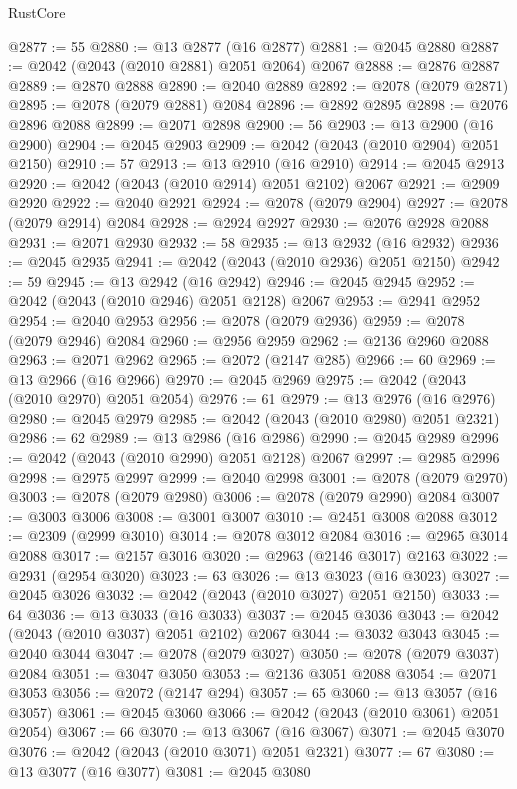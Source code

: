 \begin{lexlean}{RustCore}
\begin{coremodule}
@2877 := 55
@2880 := @13 @2877 (@16 @2877)
@2881 := @2045 @2880
@2887 := @2042 (@2043 (@2010 @2881) @2051 @2064) @2067
@2888 := @2876 @2887
@2889 := @2870 @2888
@2890 := @2040 @2889
@2892 := @2078 (@2079 @2871)
@2895 := @2078 (@2079 @2881) @2084
@2896 := @2892 @2895
@2898 := @2076 @2896 @2088
@2899 := @2071 @2898
@2900 := 56
@2903 := @13 @2900 (@16 @2900)
@2904 := @2045 @2903
@2909 := @2042 (@2043 (@2010 @2904) @2051 @2150)
@2910 := 57
@2913 := @13 @2910 (@16 @2910)
@2914 := @2045 @2913
@2920 := @2042 (@2043 (@2010 @2914) @2051 @2102) @2067
@2921 := @2909 @2920
@2922 := @2040 @2921
@2924 := @2078 (@2079 @2904)
@2927 := @2078 (@2079 @2914) @2084
@2928 := @2924 @2927
@2930 := @2076 @2928 @2088
@2931 := @2071 @2930
@2932 := 58
@2935 := @13 @2932 (@16 @2932)
@2936 := @2045 @2935
@2941 := @2042 (@2043 (@2010 @2936) @2051 @2150)
@2942 := 59
@2945 := @13 @2942 (@16 @2942)
@2946 := @2045 @2945
@2952 := @2042 (@2043 (@2010 @2946) @2051 @2128) @2067
@2953 := @2941 @2952
@2954 := @2040 @2953
@2956 := @2078 (@2079 @2936)
@2959 := @2078 (@2079 @2946) @2084
@2960 := @2956 @2959
@2962 := @2136 @2960 @2088
@2963 := @2071 @2962
@2965 := @2072 (@2147 @285)
@2966 := 60
@2969 := @13 @2966 (@16 @2966)
@2970 := @2045 @2969
@2975 := @2042 (@2043 (@2010 @2970) @2051 @2054)
@2976 := 61
@2979 := @13 @2976 (@16 @2976)
@2980 := @2045 @2979
@2985 := @2042 (@2043 (@2010 @2980) @2051 @2321)
@2986 := 62
@2989 := @13 @2986 (@16 @2986)
@2990 := @2045 @2989
@2996 := @2042 (@2043 (@2010 @2990) @2051 @2128) @2067
@2997 := @2985 @2996
@2998 := @2975 @2997
@2999 := @2040 @2998
@3001 := @2078 (@2079 @2970)
@3003 := @2078 (@2079 @2980)
@3006 := @2078 (@2079 @2990) @2084
@3007 := @3003 @3006
@3008 := @3001 @3007
@3010 := @2451 @3008 @2088
@3012 := @2309 (@2999 @3010)
@3014 := @2078 @3012 @2084
@3016 := @2965 @3014 @2088
@3017 := @2157 @3016
@3020 := @2963 (@2146 @3017) @2163
@3022 := @2931 (@2954 @3020)
@3023 := 63
@3026 := @13 @3023 (@16 @3023)
@3027 := @2045 @3026
@3032 := @2042 (@2043 (@2010 @3027) @2051 @2150)
@3033 := 64
@3036 := @13 @3033 (@16 @3033)
@3037 := @2045 @3036
@3043 := @2042 (@2043 (@2010 @3037) @2051 @2102) @2067
@3044 := @3032 @3043
@3045 := @2040 @3044
@3047 := @2078 (@2079 @3027)
@3050 := @2078 (@2079 @3037) @2084
@3051 := @3047 @3050
@3053 := @2136 @3051 @2088
@3054 := @2071 @3053
@3056 := @2072 (@2147 @294)
@3057 := 65
@3060 := @13 @3057 (@16 @3057)
@3061 := @2045 @3060
@3066 := @2042 (@2043 (@2010 @3061) @2051 @2054)
@3067 := 66
@3070 := @13 @3067 (@16 @3067)
@3071 := @2045 @3070
@3076 := @2042 (@2043 (@2010 @3071) @2051 @2321)
@3077 := 67
@3080 := @13 @3077 (@16 @3077)
@3081 := @2045 @3080

\end{coremodule}
\end{lexlean}
